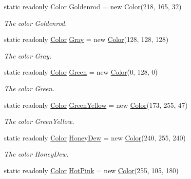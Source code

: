 \begin{DoxyCompactItemize}
static readonly \hyperlink{struct_tri_devs_1_1_tri_engine_1_1_color}{Color} \hyperlink{struct_tri_devs_1_1_tri_engine_1_1_color_aa31391281c8f1dff82333b7c2e247f1e}{Goldenrod} = new \hyperlink{struct_tri_devs_1_1_tri_engine_1_1_color}{Color}(218, 165, 32)
\begin{DoxyCompactList}\small\item\em The color Goldenrod. \end{DoxyCompactList}\item 
static readonly \hyperlink{struct_tri_devs_1_1_tri_engine_1_1_color}{Color} \hyperlink{struct_tri_devs_1_1_tri_engine_1_1_color_a35a7faccbf665c7e359f6fe03ef32477}{Gray} = new \hyperlink{struct_tri_devs_1_1_tri_engine_1_1_color}{Color}(128, 128, 128)
\begin{DoxyCompactList}\small\item\em The color Gray. \end{DoxyCompactList}\item 
static readonly \hyperlink{struct_tri_devs_1_1_tri_engine_1_1_color}{Color} \hyperlink{struct_tri_devs_1_1_tri_engine_1_1_color_a13d7c5260748494fa3d4137f26b2e8ae}{Green} = new \hyperlink{struct_tri_devs_1_1_tri_engine_1_1_color}{Color}(0, 128, 0)
\begin{DoxyCompactList}\small\item\em The color Green. \end{DoxyCompactList}\item 
static readonly \hyperlink{struct_tri_devs_1_1_tri_engine_1_1_color}{Color} \hyperlink{struct_tri_devs_1_1_tri_engine_1_1_color_af50c0617a04cb205d20b41beec343e2f}{Green\-Yellow} = new \hyperlink{struct_tri_devs_1_1_tri_engine_1_1_color}{Color}(173, 255, 47)
\begin{DoxyCompactList}\small\item\em The color Green\-Yellow. \end{DoxyCompactList}\item 
static readonly \hyperlink{struct_tri_devs_1_1_tri_engine_1_1_color}{Color} \hyperlink{struct_tri_devs_1_1_tri_engine_1_1_color_a307fd0661fcfa7adfc2a988f0dbde7dc}{Honey\-Dew} = new \hyperlink{struct_tri_devs_1_1_tri_engine_1_1_color}{Color}(240, 255, 240)
\begin{DoxyCompactList}\small\item\em The color Honey\-Dew. \end{DoxyCompactList}\item 
static readonly \hyperlink{struct_tri_devs_1_1_tri_engine_1_1_color}{Color} \hyperlink{struct_tri_devs_1_1_tri_engine_1_1_color_a5cf2ee1676813fc9671b5cdaad7334b4}{Hot\-Pink} = new \hyperlink{struct_tri_devs_1_1_tri_engine_1_1_color}{Color}(255, 105, 180)

\end{DoxyCompactItemize}
